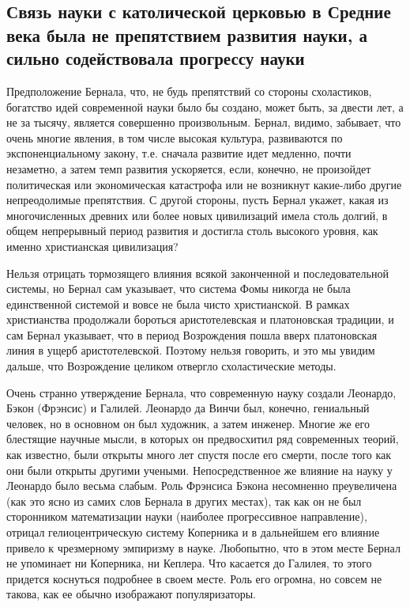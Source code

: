 \subsection{Связь науки с католической церковью в Средние века была не
препятствием развития науки, а сильно содействовала прогрессу науки}

Предположение   Бернала,  что,   не   будь   препятствий  со   стороны
схоластиков,  богатство  идей  современной   науки  было  бы  создано,
может  быть,  за двести  лет,  а  не  за тысячу,  является  совершенно
произвольным. Бернал,  видимо, забывает,  что очень многие  явления, в
том числе  высокая культура, развиваются по  экспоненциальному закону,
т.е.  сначала  развитие  идет   медленно,  почти  незаметно,  а  затем
темп развития  ускоряется, если,  конечно, не  произойдет политическая
или  экономическая  катастрофа  или  не  возникнут  какие-либо  другие
непреодолимые  препятствия. С  другой  стороны,  пусть Бернал  укажет,
какая  из многочисленных  древних  или более  новых цивилизаций  имела
столь долгий,  в общем  непрерывный период  развития и  достигла столь
высокого уровня, как именно христианская цивилизация?

Нельзя   отрицать    тормозящего   влияния   всякой    законченной   и
последовательной  системы,  но  Бернал   сам  указывает,  что  система
Фомы  никогда   не  была  единственной   системой  и  вовсе   не  была
чисто   христианской.  В   рамках  христианства   продолжали  бороться
аристотелевская  и  платоновская  традиции, и  сам  Бернал  указывает,
что  в  период Возрождения  пошла  вверх  платоновская линия  в  ущерб
аристотелевской. Поэтому нельзя говорить, и  это мы увидим дальше, что
Возрождение целиком отвергло схоластические методы.

Очень  странно  утверждение  Бернала, что  современную  науку  создали
Леонардо, Бэкон (Фрэнсис)  и Галилей. Леонардо да  Винчи был, конечно,
гениальный человек,  но в основном  он был художник, а  затем инженер.
Многие же его  блестящие научные мысли, в которых  он предвосхитил ряд
современных  теорий,  как  известно,  были открыты  много  лет  спустя
после его  смерти, после  того как они  были открыты  другими учеными.
Непосредственное же  влияние на науку  у Леонардо было  весьма слабым.
Роль Фрэнсиса  Бэкона несомненно преувеличена  (как это ясно  из самих
слов  Бернала  в  других  местах),  так  как  он  не  был  сторонником
математизации  науки  (наиболее  прогрессивное  направление),  отрицал
гелиоцентрическую систему Коперника и в дальнейшем его влияние привело
к чрезмерному эмпиризму в науке. Любопытно, что в этом месте Бернал не
упоминает ни Коперника, ни Кеплера.  Что касается до Галилея, то этого
придется  коснуться подробнее  в  своем месте.  Роль  его огромна,  но
совсем не такова, как ее обычно изображают популяризаторы.

